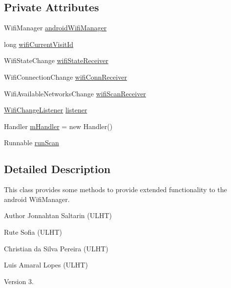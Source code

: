 \subsection*{Private Attributes}
\begin{DoxyCompactItemize}
\item 
Wifi\+Manager \hyperlink{classeu_1_1uloop_1_1mobilitytracker_1_1MTrackerWifiManager_a5d7d506ad530ce77d172bd20bb6c1cf8}{android\+Wifi\+Manager}
\item 
long \hyperlink{classeu_1_1uloop_1_1mobilitytracker_1_1MTrackerWifiManager_af4c667aa1375701ea4249214d3fd6a24}{wifi\+Current\+Visit\+Id}
\item 
Wifi\+State\+Change \hyperlink{classeu_1_1uloop_1_1mobilitytracker_1_1MTrackerWifiManager_a3222b93c74d48805b64d8bc0ffddf985}{wifi\+State\+Receiver}
\item 
Wifi\+Connection\+Change \hyperlink{classeu_1_1uloop_1_1mobilitytracker_1_1MTrackerWifiManager_a38fd50d850dcd484365ddaede7b066e7}{wifi\+Conn\+Receiver}
\item 
Wifi\+Available\+Networks\+Change \hyperlink{classeu_1_1uloop_1_1mobilitytracker_1_1MTrackerWifiManager_af961ecc022f7a22e2258ba748f2abbab}{wifi\+Scan\+Receiver}
\item 
\hyperlink{interfaceeu_1_1uloop_1_1mobilitytracker_1_1WifiChangeListener}{Wifi\+Change\+Listener} \hyperlink{classeu_1_1uloop_1_1mobilitytracker_1_1MTrackerWifiManager_aa1d154da1bb361b67fa73df8c0c7ec37}{listener}
\item 
Handler \hyperlink{classeu_1_1uloop_1_1mobilitytracker_1_1MTrackerWifiManager_a4ae9d37ad258e6924a4ece10984013ee}{m\+Handler} = new Handler()
\item 
Runnable \hyperlink{classeu_1_1uloop_1_1mobilitytracker_1_1MTrackerWifiManager_a0aed1c15634c782fa21ca690865ef3cf}{run\+Scan}
\end{DoxyCompactItemize}


\subsection{Detailed Description}
This class provides some methods to provide extended functionality to the android Wifi\+Manager.

\begin{DoxyAuthor}{Author}
Jonnahtan Saltarin (U\+L\+H\+T) 

Rute Sofia (U\+L\+H\+T) 

Christian da Silva Pereira (U\+L\+H\+T) 

Luis Amaral Lopes (U\+L\+H\+T)
\end{DoxyAuthor}
\begin{DoxyVersion}{Version}
3. 
\end{DoxyVersion}


